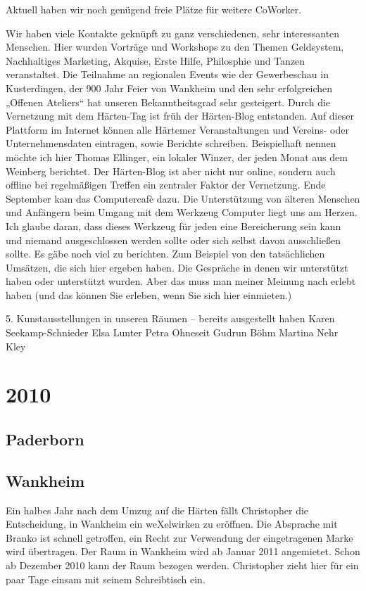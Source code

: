\begin{appendix}
Aktuell haben wir noch genügend freie Plätze für weitere CoWorker.

Wir haben viele Kontakte geknüpft zu ganz verschiedenen, sehr interessanten Menschen. Hier wurden Vorträge und Workshops zu den Themen Geldsystem, Nachhaltiges Marketing, Akquise, Erste Hilfe, Philosphie und Tanzen veranstaltet.
Die Teilnahme an regionalen Events wie der Gewerbeschau in Kusterdingen, der 900 Jahr Feier von Wankheim und den sehr erfolgreichen „Offenen Ateliers“ hat unseren Bekanntheitsgrad sehr gesteigert.
Durch die Vernetzung mit dem Härten-Tag ist früh der Härten-Blog entstanden. Auf dieser Plattform im Internet können alle Härtemer Veranstaltungen und Vereins- oder Unternehmensdaten eintragen, sowie Berichte schreiben. Beispielhaft nennen möchte ich hier Thomas Ellinger, ein lokaler Winzer, der jeden Monat aus dem Weinberg berichtet. Der Härten-Blog ist aber nicht nur online, sondern auch offline bei regelmäßigen Treffen ein zentraler Faktor der Vernetzung.
Ende September kam das Computercafè dazu. Die Unterstützung von älteren Menschen und Anfängern beim Umgang mit dem Werkzeug Computer liegt uns am Herzen. Ich glaube daran, dass dieses Werkzeug für jeden eine Bereicherung sein kann und niemand ausgeschlossen werden sollte oder sich selbst davon ausschließen sollte.
Es gäbe noch viel zu berichten. Zum Beispiel von den tatsächlichen Umsätzen, die sich hier ergeben haben. Die Gespräche in denen wir unterstützt haben oder unterstützt wurden. Aber das muss man meiner Meinung nach erlebt haben (und das können Sie erleben, wenn Sie sich hier einmieten.)

5. Kunstausstellungen in unseren Räumen – bereits ausgestellt haben
Karen Seekamp-Schnieder
Elsa Lunter
Petra Ohneseit
Gudrun Böhm
Martina Nehr Kley
  \section{2010}
    \subsection{Paderborn}
    \subsection{Wankheim}
Ein halbes Jahr nach dem Umzug auf die Härten fällt Christopher die Entscheidung, in Wankheim ein weXelwirken zu eröffnen. Die Absprache mit Branko ist schnell getroffen, ein Recht zur Verwendung der eingetragenen Marke wird übertragen.
Der Raum in Wankheim wird ab Januar 2011 angemietet. Schon ab Dezember 2010 kann der Raum bezogen werden. Christopher zieht hier für ein paar Tage einsam mit seinem Schreibtisch ein.


\end{appendix}
